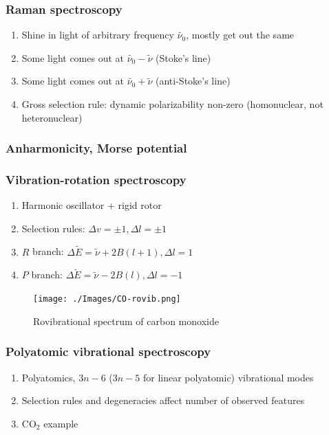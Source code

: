 \documentclass[11pt]{article}
\begin{document}
\subsubsection{Raman spectroscopy}
\label{sec:org2660264}
\begin{enumerate}
\item Shine in light of arbitrary frequency \(\tilde{\nu_0}\), mostly get out the same
\item Some light comes out at \(\tilde{\nu_0}-\tilde{\nu}\) (Stoke's line)
\item Some light comes out at \(\tilde{\nu_0}+\tilde{\nu}\) (anti-Stoke's line)
\item Gross selection rule: dynamic polarizability non-zero (homonuclear, not heteronuclear)
\end{enumerate}
\subsubsection{Anharmonicity, Morse potential}
\label{sec:orgb9b4e07}
\subsubsection{Vibration-rotation spectroscopy}
\label{sec:org35d20f1}
\begin{enumerate}
\item Harmonic oscillator + rigid rotor
\item Selection rules: \(\Delta v = \pm 1, \Delta l=\pm 1\)
\item \(R\) branch: \(\Delta \tilde E  = \tilde \nu + 2B(l+1), \Delta l = 1\)
\item \(P\) branch: \(\Delta \tilde E = \tilde \nu - 2B(l), \Delta l = -1\)
\end{enumerate}
\begin{figure}[htbp]
\centering
\texttt{[image: ./Images/CO-rovib.png]}
\caption{Rovibrational spectrum of carbon monoxide}
\end{figure}
\subsubsection{Polyatomic vibrational spectroscopy}
\label{sec:org81bc74f}
\begin{enumerate}
\item Polyatomics, \(3n-6\) (\(3n-5\) for linear polyatomic) vibrational modes
\item Selection rules and degeneracies affect number of observed features
\item CO\(_2\) example
\end{enumerate}
\end{document}
